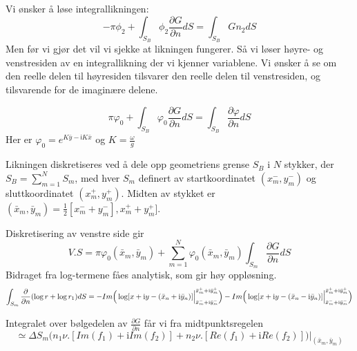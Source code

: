 Vi ønsker å løse integrallikningen:
\begin{equation}\label{eq:144}
    -\pi \phi_2  + \int_{S_B} \phi_2 \frac{\partial G}{\partial n}  dS = \int_{S_B} G n_2 dS
\end{equation}
Men før vi gjør det vil vi sjekke at likningen fungerer. Så vi løser høyre- og venstresiden av en integrallikning der vi kjenner variablene. Vi ønsker å se om den reelle delen til høyresiden tilsvarer den reelle delen til venstresiden, og tilsvarende for de imaginære delene. 

\begin{equation}
    \pi \varphi_0  + \int_{S_B} \varphi_0 \frac{\partial G}{\partial n}  dS = \int_{S_B} \frac{\partial \varphi}{\partial n}  dS
\end{equation}
Her er $\varphi_0 = e^{K\bar{y} - \textsf{i}  K \bar{x}}$ og $K = \frac{\omega}{g}$

Likningen diskretiseres ved å dele opp geometriens grense $S_B$ i $N$ stykker, der $S_B = \sum_{m=1}^{N} S_m$, med hver $S_m$ definert av startkoordinatet $(x_{m}^{-} , y_{m}^{-})$ og sluttkoordinatet $(x_{m}^{+} , y_{m}^{+})$. Midten av stykket er $(\bar{x}_{m} , \bar{y}_{m}) = \frac{1}{2}[x_{m}^{-} + y_{m}^{-}], x_{m}^{+} + y_{m}^{+}]$.

Diskretisering av venstre side gir
\begin{equation}
	V.S = \pi \varphi_0( \bar{x}_{m} , \bar{y}_{m}) + \sum_{m=1}^{N} \varphi_0( \bar{x}_{m}, \bar{y}_{m}) \int_{S_m} \frac{\partial G}{\partial n} dS
\end{equation}
Bidraget fra log-termene fåes analytisk, som gir høy oppløsning.
 \begin{equation}
  	\int_{S_m} \frac{\partial}{\partial n}(\log r + \log r_1) dS \\
= -Im\Big( \Big.\log[x + \mathrm{i} y - ( \bar{x}_{n} +\mathrm{i} \bar{y}_{n})]\Big|_{ \bar{x}_{m}^{-} +\mathrm{i} \bar{y}_{m}^{-}}^{ \bar{x}_{m}^{+} +\mathrm{i} \bar{y}_{m}^{+}} \Big) -Im\Big( \Big.\log[x + \mathrm{i} y - ( \bar{x}_{n} -\mathrm{i} \bar{y}_{n})]\Big|_{\bar{x}_{m}^{-} +\mathrm{i} \bar{y}_{m}^{-}}^{\bar{x}_{m}^{+} +\mathrm{i} \bar{y}_{m}^{+}} \Big)
\end{equation}

Integralet over bølgedelen av $\frac{\partial G}{\partial n}$ får vi fra midtpunktsregelen
\begin{equation}
	\simeq \Delta S_m \bigg( n_1 \nu \Big.[ Im(f_1) + \mathrm{i} Im(f_2) ] + n_2 \nu \Big.[ Re(f_1) + \mathrm{i} Re(f_2) ]  \bigg)\Big|_{( \bar{x}_{m} , \bar{y}_{m})}
\end{equation}

